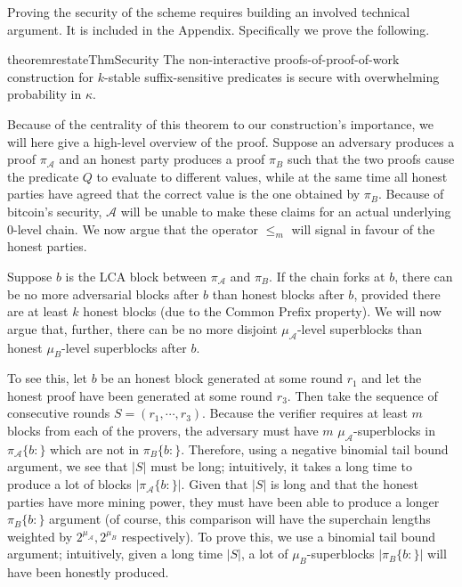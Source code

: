 
Proving the security of the scheme requires building an involved technical
argument. It is included in the Appendix. Specifically we prove the following. 

\begin{restatable}{theorem}{restateThmSecurity}
    \label{thm.security}
    The non-interactive proofs-of-proof-of-work construction for $k$-stable
    suffix-sensitive predicates is secure with overwhelming probability in
    $\kappa$.
\end{restatable}

Because of the centrality of this theorem to our construction's importance, we
will here give a high-level overview of the proof. Suppose an adversary produces
a proof $\pi_\mathcal{A}$ and an honest party produces a proof $\pi_B$ such that
the two proofs cause the predicate $Q$ to evaluate to different values, while at
the same time all honest parties have agreed that the correct value is the one
obtained by $\pi_B$. Because of bitcoin's security, $\mathcal{A}$ will be unable
to make these claims for an actual underlying 0-level chain. We now argue that
the operator $\leq_m$ will signal in favour of the honest parties.

Suppose $b$ is the LCA block between $\pi_\mathcal{A}$ and $\pi_B$. If the chain
forks at $b$, there can be no more adversarial blocks after $b$ than honest
blocks after $b$, provided there are at least $k$ honest blocks (due to the
Common Prefix property). We will now argue that, further, there can be no more
disjoint $\mu_\mathcal{A}$-level superblocks than honest $\mu_B$-level
superblocks after $b$.

To see this, let $b$ be an honest block generated at some round $r_1$ and let
the honest proof have been generated at some round $r_3$. Then take the sequence
of consecutive rounds $S = (r_1, \cdots, r_3)$. Because the verifier requires at
least $m$ blocks from each of the provers, the adversary must have $m$
$\mu_\mathcal{A}$-superblocks in $\pi_\mathcal{A}\{b:\}$ which are not in
$\pi_B\{b:\}$. Therefore, using a negative binomial tail bound argument, we see that $|S|$
must be long; intuitively, it takes a long time to produce a lot of blocks
$|\pi_\mathcal{A}\{b:\}|$. Given that $|S|$ is long and that the honest parties
have more mining power, they must have been able to produce a longer
$\pi_B\{b:\}$ argument (of course, this comparison will have the superchain
lengths weighted by $2^{\mu_\mathcal{A}}, 2^{\mu_B}$ respectively). To prove
this, we use a binomial tail bound argument; intuitively, given a long time $|S|$, a lot of
$\mu_B$-superblocks $|\pi_B\{b:\}|$ will have been honestly produced.

